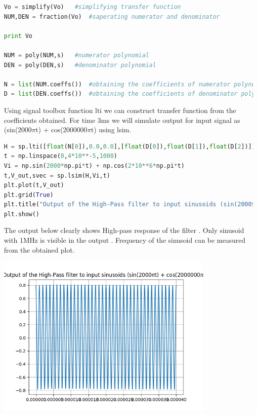 \documentclass[a4paper]{article}
\begin{document}
\begin{lstlisting}[language=Python]
Vo = simplify(Vo)	#simplifying transfer function
NUM,DEN = fraction(Vo)	#saperating numerator and denominator

print Vo

NUM = poly(NUM,s)	#numerator polynomial
DEN = poly(DEN,s)	#denominator polynomial

N = list(NUM.coeffs())	#obtaining the coefficients of numerator polynomial in list
D = list(DEN.coeffs())  #obtaining the coefficients of denominator polynomial in list

\end{lstlisting}
Using signal toolbox function lti we can construct transfer function from the coefficients obtained. For time  3ms we will simulate output for input signal as (sin(2000$\pi$t) + cos(2000000$\pi$t) using lsim.
\begin{lstlisting}[language=Python]
H = sp.lti([float(N[0]),0.0,0.0],[float(D[0]),float(D[1]),float(D[2])])
t = np.linspace(0,4*10**-5,1000)
Vi = np.sin(2000*np.pi*t) + np.cos(2*10**6*np.pi*t)
t,V_out,svec = sp.lsim(H,Vi,t)
plt.plot(t,V_out) 
plt.grid(True)
plt.title("Output of the High-Pass filter to input sinusoids (sin(2000$\pi$t) + cos(2000000$\pi$t))")
plt.show()
\end{lstlisting}
The output below clearly shows High-pass response of the filter . Only sinusoid with 1MHz is visible in the output . Frequency of the sinusoid can be measured from the obtained plot.
\begin{center}
\includegraphics[width=0.8\textwidth]{Figure_4.png}
\end{center}
\end{document}
